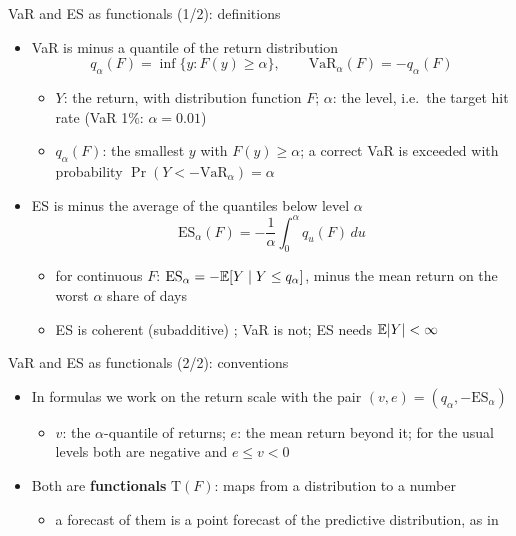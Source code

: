 \begin{frame}{VaR and ES as functionals (1/2): definitions}
\itemsize{\small}
\begin{itemize}
    \item VaR is minus a quantile of the return distribution
    \[ q_\alpha(F) = \inf\{y: F(y) \ge \alpha\}, \qquad \mathrm{VaR}_\alpha(F) = -q_\alpha(F) \]
    \begin{itemize}
        \item $Y$: the return, with distribution function $F$; $\alpha$: the level, i.e.\ the target hit rate (VaR 1\%: $\alpha = 0.01$)
        \item $q_\alpha(F)$: the smallest $y$ with $F(y) \ge \alpha$; a correct VaR is exceeded with probability $\Pr(Y < -\mathrm{VaR}_\alpha) = \alpha$
    \end{itemize}
    \item ES is minus the average of the quantiles below level $\alpha$ 
    \[ \mathrm{ES}_\alpha(F) = -\frac{1}{\alpha}\int_0^\alpha q_u(F)\,du \]
    \begin{itemize}
        \item for continuous $F$: $\mathrm{ES}_\alpha = -\mathbb{E}[Y \mid Y \le q_\alpha]$, minus the mean return on the worst $\alpha$ share of days
        \item ES is coherent (subadditive) ; VaR is not; ES needs $\mathbb{E}|Y| < \infty$
    \end{itemize}
\end{itemize}
\end{frame}

\begin{frame}{VaR and ES as functionals (2/2): conventions}
\itemsize{\small}
\begin{itemize}
    \item In formulas we work on the return scale with the pair $(v, e) = (q_\alpha, -\mathrm{ES}_\alpha)$
    \begin{itemize}
        \item $v$: the $\alpha$-quantile of returns; $e$: the mean return beyond it; for the usual levels both are negative and $e \le v < 0$
    \end{itemize}
    \item Both are \textbf{functionals} $\mathrm T(F)$: maps from a distribution to a number
    \begin{itemize}
        \item a forecast of them is a point forecast of the predictive distribution, as in 
    \end{itemize}
\end{itemize}
\end{frame}

